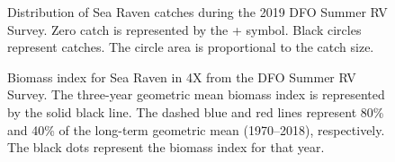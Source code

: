 \documentclass[11pt]{book}
\begin{document}
\begin{figure}[htb]

{\centering {} 

}

\caption{Distribution of Sea Raven catches during the 2019 DFO Summer RV Survey. Zero catch is represented by the + symbol. Black circles represent catches. The circle area is proportional to the catch size.}\label{fig:113-map-searaven}
\end{figure}

\begin{figure}[htb]

{\centering {} 

}

\caption{Biomass index for Sea Raven in 4X from the DFO Summer RV Survey. The three-year geometric mean biomass index is represented by the solid black line. The dashed blue and red lines represent 80\% and 40\% of the long-term geometric mean (1970--2018), respectively. The black dots represent the biomass index for that year.}\label{fig:114-fig-searaven-biomass4X}
\end{figure}
\end{document}
